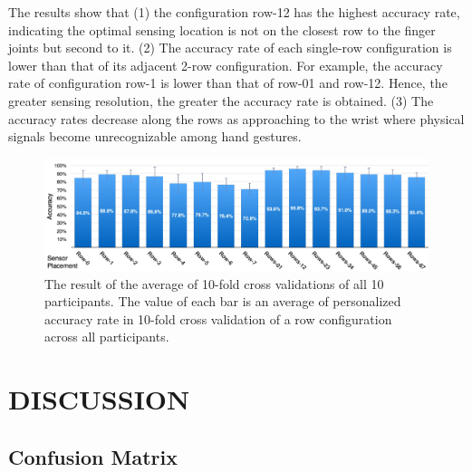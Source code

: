 \documentclass{sigchi}
\begin{document}
The results show that
(1) the configuration row-12 has the highest accuracy rate, indicating the optimal sensing location is not on the closest row to the finger joints but second to it. 
(2) The accuracy rate of each single-row configuration is lower than that of its adjacent 2-row configuration. For example, the accuracy rate of configuration row-1 is lower than that of row-01 and row-12. Hence, the greater sensing resolution, the greater the accuracy rate is obtained. 
(3) The accuracy rates decrease along the rows as approaching to the wrist where physical signals become unrecognizable among hand gestures.

\begin{figure}
 \begin{center}
  \includegraphics[width=2\columnwidth]{figures/10FCV_16_v2.pdf}
  \caption{
    The result of the average of 10-fold cross validations of all 10 participants. The value of each bar is an average of personalized accuracy rate in 10-fold cross validation of a row configuration across all participants.
  }
  \label{fig:accuracy16Gs}
  \end{center}
\end{figure}

\section{DISCUSSION}

\subsection{Confusion Matrix}
\end{document}
